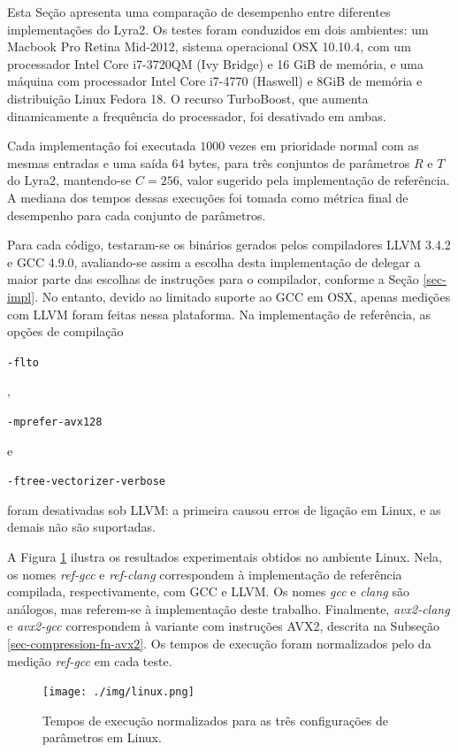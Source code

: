 \documentclass{article}
\begin{document}
Esta Seção apresenta uma comparação de desempenho entre diferentes
implementações do Lyra2. Os testes foram conduzidos em dois ambientes: um
Macbook Pro Retina Mid-2012, sistema operacional OSX 10.10.4, com um
processador Intel Core i7-3720QM (Ivy Bridge) e 16 GiB de memória, e uma
máquina com processador Intel Core i7-4770 (Haswell) e 8GiB de memória e
distribuição Linux Fedora 18. O recurso TurboBoost, que aumenta dinamicamente a
frequência do processador, foi desativado em ambas.

Cada implementação foi executada $1000$ vezes em prioridade normal com as
mesmas entradas e uma saída $64$ bytes, para três conjuntos de parâmetros $R$ e
$T$ do Lyra2, mantendo-se $C = 256$, valor sugerido pela implementação de
referência. A mediana dos tempos dessas execuções foi tomada como métrica final
de desempenho para cada conjunto de parâmetros.

Para cada código, testaram-se os binários gerados pelos compiladores LLVM 3.4.2
e GCC 4.9.0, avaliando-se assim a escolha desta implementação de delegar a maior parte
das escolhas de instruções para o compilador, conforme a Seção \ref{sec-impl}.
No entanto, devido ao limitado suporte ao GCC em OSX, apenas medições com LLVM
foram feitas nessa plataforma. Na implementação de referência, as opções de
compilação \begin{small}\verb|-flto|\end{small},
\begin{small}\verb|-mprefer-avx128|\end{small} e
\begin{small}\verb|-ftree-vectorizer-verbose|\end{small} foram desativadas sob
LLVM: a primeira causou erros de ligação em Linux, e as demais não são
suportadas.

A Figura \ref{results-linux} ilustra os resultados experimentais obtidos no
ambiente Linux. Nela, os nomes \emph{ref-gcc} e \emph{ref-clang} correspondem à
implementação de referência compilada, respectivamente, com GCC e LLVM. Os
nomes \emph{gcc} e \emph{clang} são análogos, mas referem-se à implementação
deste trabalho. Finalmente, \emph{avx2-clang} e \emph{avx2-gcc} correspondem à
variante com instruções AVX2, descrita na Subseção
\ref{sec-compression-fn-avx2}. Os tempos de execução foram normalizados pelo da
medição \emph{ref-gcc} em cada teste.

\begin{figure}[htbp]
\centering
\texttt{[image: ./img/linux.png]}
\caption{Tempos de execução normalizados para as três configurações de parâmetros em Linux\label{results-linux}.}
\end{figure}
\end{document}

